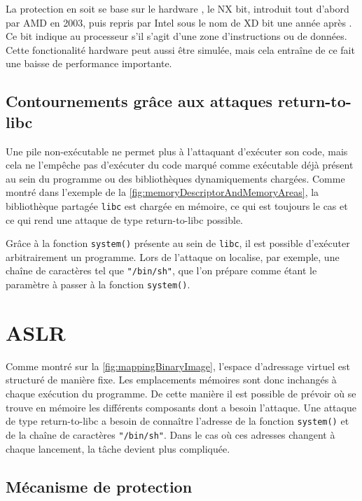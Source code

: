 La protection en soit se base sur le \og hardware \fg, le NX bit, introduit tout d'abord par AMD en 2003, puis repris par Intel sous le nom de \og XD bit \fg une année après \cite{ExecutableSpaceProtection, NXBit}. Ce bit indique au processeur s'il s'agit d'une zone d'instructions ou de données. Cette fonctionalité \og hardware \fg peut aussi être simulée, mais cela entraîne de ce fait une baisse de performance importante.

\subsection{Contournements grâce aux attaques \og return-to-libc \fg}

Une pile non-exécutable ne permet plus à l'attaquant d'exécuter son code, mais cela ne l'empêche pas d'exécuter du code marqué comme exécutable déjà présent au sein du programme ou des bibliothèques dynamiquements chargées. Comme montré dans l'exemple de la \autoref{fig:memoryDescriptorAndMemoryAreas}, la bibliothèque partagée \texttt{libc} est chargée en mémoire, ce qui est toujours le cas et ce qui rend une attaque de type \og return-to-libc \fg \cite{ReturntolibcAttack} possible.

Grâce à la fonction \texttt{system()} présente au sein de \texttt{libc}, il est possible d'exécuter arbitrairement un programme. Lors de l'attaque on localise, par exemple, une chaîne de caractères tel que \texttt{"/bin/sh"}, que l'on prépare comme étant le paramètre à passer à la fonction \texttt{system()}.

\section{ASLR}
\label{section:aslr}

Comme montré sur la \autoref{fig:mappingBinaryImage}, l'espace d'adressage virtuel est structuré de manière fixe. Les emplacements mémoires sont donc inchangés à chaque exécution du programme. De cette manière il est possible de prévoir où se trouve en mémoire les différents composants dont a besoin l'attaque. Une attaque de type \og return-to-libc \fg a besoin de connaître l'adresse de la fonction \texttt{system()} et de la chaîne de caractères \texttt{"/bin/sh"}. Dans le cas où ces adresses changent à chaque lancement, la tâche devient plus compliquée.

\subsection{Mécanisme de protection}

